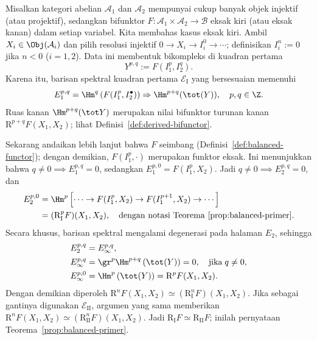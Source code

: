 \begin{example}\label{eg:bifunctor-ss}
	Misalkan kategori abelian $\mathcal{A}_1$ dan $\mathcal{A}_2$ mempunyai
	cukup banyak objek injektif (atau projektif), sedangkan bifunktor
	$F:\mathcal{A}_1\times\mathcal{A}_2\to\mathcal{B}$ eksak kiri (atau eksak
	kanan) dalam setiap variabel. Kita membahas kasus eksak kiri. Ambil
	$X_i\in\Obj(\mathcal{A}_i)$ dan pilih resolusi injektif
	$0\to X_i\to I_i^0\to\cdots$; definisikan $I_i^n:=0$ jika $n<0$
	($i=1,2$). Data ini membentuk bikompleks di kuadran pertama
	\[ Y^{p, q} := F\left( I_1^p, I_2^q \right). \]
	Karena itu, barisan spektral kuadran pertama $\mathscr{E}_{\mathrm{I}}$
	yang bersesuaian memenuhi
	\[ E_1^{p,q} = \Hm^q\left( F(I_1^p, I_2^\bullet) \right) \Rightarrow \Hm^{p+q}(\tot(Y)), \quad p,q \in \Z. \]
	Ruas kanan $\Hm^{p+q}(\tot Y)$ merupakan nilai bifunktor turunan kanan
	$\mathrm{R}^{p+q}F(X_1,X_2)$; lihat
	Definisi~\ref{def:derived-bifunctor}.

	Sekarang andaikan lebih lanjut bahwa $F$ seimbang
	(Definisi~\ref{def:balanced-functor}); dengan demikian,
	$F(I_1^p,\cdot)$ merupakan funktor eksak. Ini menunjukkan bahwa
	$q\neq0\implies E_1^{p,q}=0$, sedangkan
	$E_1^{p,0}=F(I_1^p,X_2)$. Jadi
	$q\neq0\implies E_2^{p,q}=0$, dan
	\begin{align*}
		E_2^{p,0} & = \Hm^p\left[ \cdots \to F(I_1^p, X_2) \to F(I_1^{p+1}, X_2) \to \cdots \right] \\
		& = (\mathrm{R}_{\mathrm{I}}^p F)(X_1, X_2), \quad \text{dengan notasi Teorema~\ref{prop:balanced-primer}}.
	\end{align*}
	Secara khusus, barisan spektral mengalami degenerasi pada halaman $E_2$,
	sehingga
	\begin{align*}
		E_2^{p,q} & = E_\infty^{p,q}, \\
		E_\infty^{p,q} & = \gr^p \Hm^{p+q}\left(\tot(Y)\right) = 0, \quad \text{jika}\; q \neq 0, \\
		E_\infty^{p,0} & = \Hm^p\left(\tot(Y)\right) = \mathrm{R}^p F(X_1, X_2) .
	\end{align*}
	Dengan demikian diperoleh
	$\mathrm{R}^nF(X_1,X_2)\simeq
	(\mathrm{R}_{\mathrm{I}}^nF)(X_1,X_2)$. Jika sebagai gantinya digunakan
	$\mathscr{E}_{\mathrm{II}}$, argumen yang sama memberikan
	$\mathrm{R}^nF(X_1,X_2)\simeq
	(\mathrm{R}_{\mathrm{II}}^nF)(X_1,X_2)$. Jadi
	$\mathrm{R}_{\mathrm{I}}F\simeq\mathrm{R}_{\mathrm{II}}F$; inilah
	pernyataan Teorema~\ref{prop:balanced-primer}.
\end{example}

